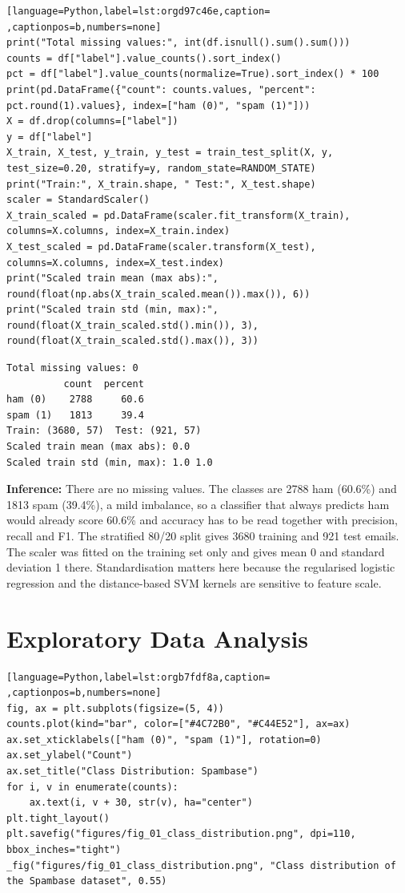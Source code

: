 \documentclass[11pt]{article}
\begin{document}
\begin{lstlisting}[language=Python,label=lst:orgd97c46e,caption= ,captionpos=b,numbers=none]
print("Total missing values:", int(df.isnull().sum().sum()))
counts = df["label"].value_counts().sort_index()
pct = df["label"].value_counts(normalize=True).sort_index() * 100
print(pd.DataFrame({"count": counts.values, "percent": pct.round(1).values}, index=["ham (0)", "spam (1)"]))
X = df.drop(columns=["label"])
y = df["label"]
X_train, X_test, y_train, y_test = train_test_split(X, y, test_size=0.20, stratify=y, random_state=RANDOM_STATE)
print("Train:", X_train.shape, " Test:", X_test.shape)
scaler = StandardScaler()
X_train_scaled = pd.DataFrame(scaler.fit_transform(X_train), columns=X.columns, index=X_train.index)
X_test_scaled = pd.DataFrame(scaler.transform(X_test), columns=X.columns, index=X_test.index)
print("Scaled train mean (max abs):", round(float(np.abs(X_train_scaled.mean()).max()), 6))
print("Scaled train std (min, max):", round(float(X_train_scaled.std().min()), 3), round(float(X_train_scaled.std().max()), 3))
\end{lstlisting}

\begin{verbatim}
Total missing values: 0
          count  percent
ham (0)    2788     60.6
spam (1)   1813     39.4
Train: (3680, 57)  Test: (921, 57)
Scaled train mean (max abs): 0.0
Scaled train std (min, max): 1.0 1.0
\end{verbatim}


\textbf{Inference:} There are no missing values. The classes are 2788 ham (60.6\%) and 1813 spam (39.4\%), a mild
imbalance, so a classifier that always predicts ham would already score 60.6\% and accuracy
has to be read together with precision, recall and F1. The stratified 80/20 split gives 3680
training and 921 test emails. The scaler was fitted on the training set only and gives mean
0 and standard deviation 1 there. Standardisation matters here because the regularised
logistic regression and the distance-based SVM kernels are sensitive to feature scale.

\section*{Exploratory Data Analysis}
\label{sec:org3596eae}

\begin{lstlisting}[language=Python,label=lst:orgb7fdf8a,caption= ,captionpos=b,numbers=none]
fig, ax = plt.subplots(figsize=(5, 4))
counts.plot(kind="bar", color=["#4C72B0", "#C44E52"], ax=ax)
ax.set_xticklabels(["ham (0)", "spam (1)"], rotation=0)
ax.set_ylabel("Count")
ax.set_title("Class Distribution: Spambase")
for i, v in enumerate(counts):
    ax.text(i, v + 30, str(v), ha="center")
plt.tight_layout()
plt.savefig("figures/fig_01_class_distribution.png", dpi=110, bbox_inches="tight")
_fig("figures/fig_01_class_distribution.png", "Class distribution of the Spambase dataset", 0.55)
\end{lstlisting}
\end{document}
